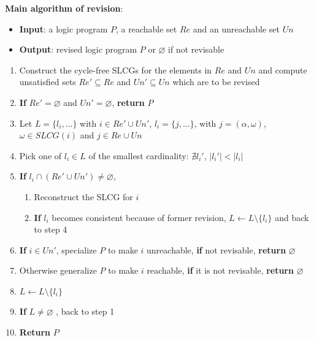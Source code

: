     \textbf{Main algorithm of revision}:
    \begin{itemize}
        \item \textbf{Input}: a logic program $P$, a reachable set $Re$ and an unreachable set $Un$
        \item \textbf{Output}: revised logic program $P$ or $\varnothing$ if not revisable
    \end{itemize}
    \begin{enumerate}
        \item Construct the cycle-free SLCGs for the elements in $Re$ and $Un$ and compute unsatisfied sets $Re'\subseteq Re$ and $Un'\subseteq Un$ which are to be revised
        \item \textbf{If} $Re'=\varnothing$ and $Un'=\varnothing$, \textbf{return} $P$
        \item Let $L=\{l_i,\ldots\}$ with $i\in Re' \cup Un'$, $l_i=\{j,\ldots\}$, with $j=(\alpha,\omega)$, $\omega \in SLCG(i)$ and $ j\in Re\cup Un$ \label{step:dependency}
        \item Pick one of $l_i\in L$ of the smallest cardinality: $\nexists l_i'$, $|l_i'| < |l_i|$ \label{step:cardinality}
        \item \textbf{If} $l_i\cap (Re'\cup Un')\neq\varnothing$, \label{step:check}
        \begin{enumerate}
            \item Reconstruct the SLCG for $i$
            \item \textbf{If} $l_i$ becomes consistent because of former revision, $L\gets L\setminus \{l_i\}$ and back to step 4
        \end{enumerate}
        \item \textbf{If} $i\in Un'$, specialize $P$ to make $i$ unreachable, \textbf{if} not revisable, \textbf{return} $\varnothing$ \label{step:specialize}
        \item Otherwise generalize $P$ to make $i$ reachable, \textbf{if} it is not revisable, \textbf{return} $\varnothing$ \label{step:generalize}
        
        \item $L\gets L\setminus\{l_i\}$ \label{step:update}
        \item \textbf{If} $L\neq\varnothing$ , back to step 1 \label{step:recheck}
        \item \textbf{Return} $P$
    \end{enumerate} 
